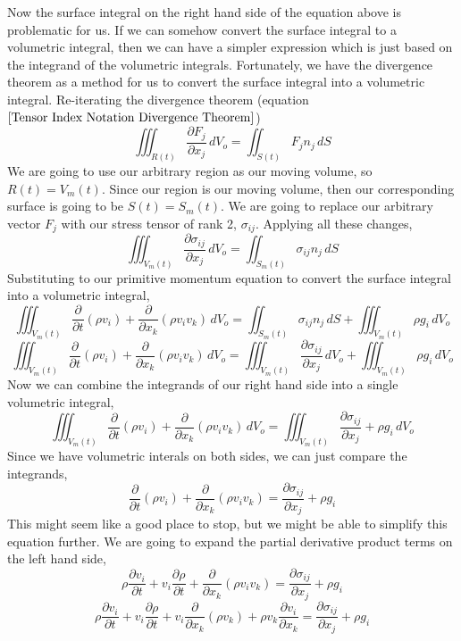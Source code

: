 Now the surface integral on the right hand side of the equation above is problematic for us. 
If we can somehow convert the surface integral to a volumetric integral, then we can have a simpler expression which is just based on the integrand of the volumetric integrals.
Fortunately, we have the divergence theorem as a method for us to convert the surface integral into a volumetric integral.
Re-iterating the divergence theorem (equation $\ref{Tensor Index Notation Divergence Theorem}$)
$$\iiint^{}_{R(t)} \frac{\partial F_{j}}{\partial x_{j}} \,dV_{o} = \iint^{}_{S(t)} F_{j}n_{j} \,dS$$
We are going to use our arbitrary region as our moving volume, so $R(t) = V_{m}(t)$. 
Since our region is our moving volume, then our corresponding surface is going to be $S(t) = S_{m}(t)$.
We are going to replace our arbitrary vector $F_{j}$ with our stress tensor of rank 2, $\sigma_{ij}$.
Applying all these changes,
$$\iiint^{}_{V_{m}(t)} \frac{\partial \sigma_{ij}}{\partial x_{j}} \,dV_{o} = \iint^{}_{S_{m}(t)} \sigma_{ij}n_{j} \,dS$$
Substituting to our primitive momentum equation to convert the surface integral into a volumetric integral,
$$\iiint^{}_{V_{m}(t)} \frac{\partial }{\partial t}(\rho v_{i}) + \frac{\partial}{\partial x_{k}} (\rho v_{i} v_{k}) \,dV_{o} = \iint^{}_{S_{m}(t)} \sigma_{ij}n_{j} \,dS + \iiint^{}_{V_{m}(t)} \rho g_{i} \,dV_{o} $$
$$\iiint^{}_{V_{m}(t)} \frac{\partial }{\partial t}(\rho v_{i}) + \frac{\partial}{\partial x_{k}} (\rho v_{i} v_{k}) \,dV_{o} = \iiint^{}_{V_{m}(t)} \frac{\partial \sigma_{ij}}{\partial x_{j}} \,dV_{o} + \iiint^{}_{V_{m}(t)} \rho g_{i} \,dV_{o} $$
Now we can combine the integrands of our right hand side into a single volumetric integral,
$$\iiint^{}_{V_{m}(t)} \frac{\partial }{\partial t}(\rho v_{i}) + \frac{\partial}{\partial x_{k}} (\rho v_{i} v_{k}) \,dV_{o} = \iiint^{}_{V_{m}(t)} \frac{\partial \sigma_{ij}}{\partial x_{j}}  +  \rho g_{i} \,dV_{o} $$
Since we have volumetric interals on both sides, we can just compare the integrands,
$$ \frac{\partial }{\partial t}(\rho v_{i}) + \frac{\partial}{\partial x_{k}} (\rho v_{i} v_{k}) = \frac{\partial \sigma_{ij}}{\partial x_{j}}  +  \rho g_{i} $$
This might seem like a good place to stop, but we might be able to simplify this equation further. 
We are going to expand the partial derivative product terms on the left hand side,
$$ \rho\frac{\partial v_{i}}{\partial t} + v_{i}\frac{\partial \rho}{\partial t} + \frac{\partial}{\partial x_{k}} (\rho v_{i} v_{k}) = \frac{\partial \sigma_{ij}}{\partial x_{j}}  +  \rho g_{i} $$
$$ \rho\frac{\partial v_{i}}{\partial t} + v_{i}\frac{\partial \rho}{\partial t} + v_{i}\frac{\partial}{\partial x_{k}} (\rho v_{k}) + \rho v_{k}\frac{\partial v_{i}}{\partial x_{k}} = \frac{\partial \sigma_{ij}}{\partial x_{j}}  +  \rho g_{i} $$
